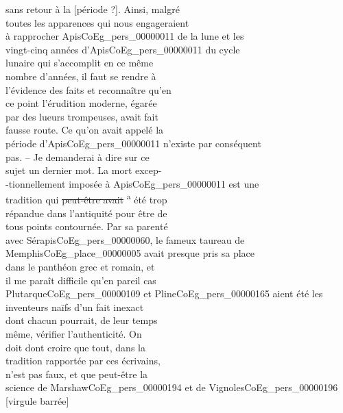\documentclass{book}
\begin{document}
{\begin{paracol}{2}
\switchcolumn
\noindent sans retour à la [période ?]. Ainsi, malgré\\
toutes les apparences qui nous engageraient\\
à rapprocher Apis\gls{CoEg_pers_00000011} de la lune et les\\
vingt-cinq années d’Apis\gls{CoEg_pers_00000011} du cycle\\
lunaire qui s’accomplit en ce même\\
nombre d’années, il faut se rendre à\\
l’évidence des faits et reconnaître qu’en\\
ce point l’érudition moderne, égarée\\
par des lueurs trompeuses, avait fait\\
fausse route. Ce qu’on avait appelé la\\
période d’Apis\gls{CoEg_pers_00000011} n’existe par conséquent\\
pas. – Je demanderai à dire sur ce\\
sujet un dernier mot. La mort excep-\\
-tionnellement imposée à Apis\gls{CoEg_pers_00000011} est une\\
tradition qui \sout{peut-être avait} \textsuperscript{a} été trop\\
répandue dans l’antiquité pour être de\\
tous points contournée. Par sa parenté\\
avec Sérapis\gls{CoEg_pers_00000060}, le fameux taureau de\\
Memphis\gls{CoEg_place_00000005} avait presque pris sa place\\
dans le panthéon grec et romain, et\\
il me paraît difficile qu’en pareil cas\\
Plutarque\gls{CoEg_pers_00000109} et Pline\gls{CoEg_pers_00000165} aient été les\\
inventeurs naïfs d’un fait inexact\\
dont chacun pourrait, de leur temps\\
même, vérifier l’authenticité. On\\
doit dont croire que tout, dans la\\
tradition rapportée par ces écrivains,\\
n’est pas faux, et que peut-être la\\
science de Marshaw\gls{CoEg_pers_00000194} et de Vignoles\gls{CoEg_pers_00000196} [virgule barrée]\\

\end{paracol}}
\end{document}
